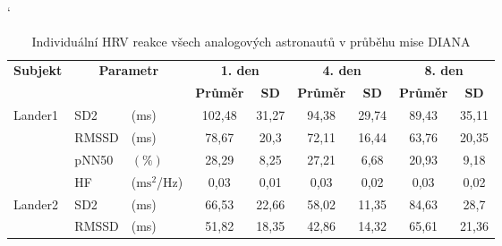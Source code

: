 \begin{table}[!htb]
    \catcode`
    \footnotesize
    \centering
    \caption{Individuální HRV reakce všech analogových astronautů v průběhu mise DIANA}
    \begin{threeparttable}
        \begin{tabular*}{\linewidth}{@{\extracolsep{\fill}} lllcccccc @{}}
            \toprule
            \textbf{Subjekt}                & \multicolumn{2}{c}{\textbf{Parametr}} & \multicolumn{2}{c}{\textbf{1. den}} & \multicolumn{2}{c}{\textbf{4. den}} & \multicolumn{2}{c}{\textbf{8. den}}                                                                 \\ \cmidrule(rl){4-5} \cmidrule(rl){6-7} \cmidrule(rl){8-9}
            &                                       &                                     & \textbf{Průměr}                     & \textbf{SD}                         & \textbf{Průměr} & \textbf{SD} & \textbf{Průměr} & \textbf{SD} \\ \midrule
            \multirow[t]{4}{*}{Lander1}     & SD2                                  & (ms)                                & 102,48                              & 31,27                               & 94,38           & 29,74       & 89,43           & 35,11       \\
            & RMSSD                                 & (ms)                                & 78,67                               & 20,3                                & 72,11           & 16,44       & 63,76           & 20,35       \\
            & pNN50                                 & $(\%)$                              & 28,29                               & 8,25                                & 27,21           & 6,68        & 20,93           & 9,18        \\
            & HF                                    & ($\text{ms}^2$/Hz)                  & 0,03                                & 0,01                                & 0,03            & 0,02        & 0,03            & 0,02        \\ \midrule
            \multirow[t]{4}{*}{Lander2}     & SD2                                  & (ms)                                & 66,53                               & 22,66                               & 58,02           & 11,35       & 84,63           & 28,7        \\
            & RMSSD                                 & (ms)                                & 51,82                               & 18,35                               & 42,86           & 14,32       & 65,61           & 21,36       \\

\end{tabular*}
\end{threeparttable}
\end{table}
